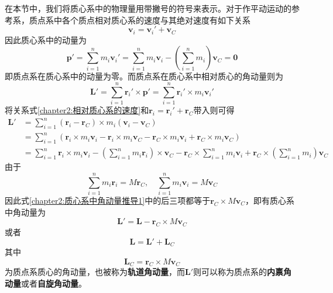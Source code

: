 在本节中，我们将质心系中的物理量用带撇号的符号来表示。对于作平动运动的参考系，质点系中各个质点相对质心系的速度与其绝对速度有如下关系
\begin{equation}
	\boldsymbol{v}_i = \boldsymbol{v}_i' + \boldsymbol{v}_C
	\label{chapter2:相对质心系的速度}
\end{equation}
因此质心系中的动量为
\begin{equation}
	\boldsymbol{p}' = \sum_{i=1}^nm_i\boldsymbol{v}_i' = \sum_{i=1}^n m_i\boldsymbol{v}_i - \left(\sum_{i=1}^n m_i\right)\boldsymbol{v}_C = \boldsymbol{0}
	\label{chapter2:质心系中的系统动量}
\end{equation}
即质点系在质心系中的动量为零。而质点系在质心系中相对质心的角动量则为
\begin{equation}
	\boldsymbol{L}' = \sum_{i=1}^n\boldsymbol{r}_i' \times \boldsymbol{p}' = \sum_{i=1}^n\boldsymbol{r}_i' \times m_i\boldsymbol{v}_i'
\end{equation}
将关系式\eqref{chapter2:相对质心系的速度}和$\boldsymbol{r}_i = \boldsymbol{r}_i' + \boldsymbol{r}_C$带入则可得
\begin{align}
	\boldsymbol{L}' & = \sum_{i=1}^n (\boldsymbol{r}_i - \boldsymbol{r}_C) \times m_i (\boldsymbol{v}_i - \boldsymbol{v}_C) \nonumber\\
	& = \sum_{i=1}^n \left(\boldsymbol{r}_i\times m_i\boldsymbol{v}_i - \boldsymbol{r}_i\times m_i\boldsymbol{v}_C - \boldsymbol{r}_C \times m_i\boldsymbol{v}_i + \boldsymbol{r}_C\times m_i\boldsymbol{v}_C\right) \nonumber\\
	& = \sum_{i=1}^n\boldsymbol{r}_i\times m_i\boldsymbol{v}_i - \left(\sum_{i=1}^nm_i\boldsymbol{r}_i\right) \times \boldsymbol{v}_C - \boldsymbol{r}_C \times \sum_{i=1}^n m_i\boldsymbol{v}_i + \boldsymbol{r}_C\times \left(\sum_{i=1}^nm_i\right)\boldsymbol{v}_C \label{chapter2:质心系中角动量推导1}
\end{align}
由于
\begin{equation*}
	\sum_{i=1}^nm_i\boldsymbol{r}_i = M\boldsymbol{r}_C, \quad \sum_{i=1}^n m_i\boldsymbol{v}_i = M\boldsymbol{v}_C
\end{equation*}
因此式\eqref{chapter2:质心系中角动量推导1}中的后三项都等于$\boldsymbol{r}_C\times M\boldsymbol{v}_C$，即有质心系中角动量为
\begin{equation}
	\boldsymbol{L}' = \boldsymbol{L} - \boldsymbol{r}_C\times M\boldsymbol{v}_C
\end{equation}
或者
\begin{equation}
	\boldsymbol{L} = \boldsymbol{L}' + \boldsymbol{L}_C
	\label{chapter2:质心系角动量与绝对角动量的关系}
\end{equation}
其中
\begin{equation}
	\boldsymbol{L}_C = \boldsymbol{r}_C\times M\boldsymbol{v}_C
\end{equation}
为质点系质心的角动量，也被称为{\bf 轨道角动量}，而$\boldsymbol{L}'$则可以称为质点系的{\bf 内禀角动量}或者{\bf 自旋角动量}。

